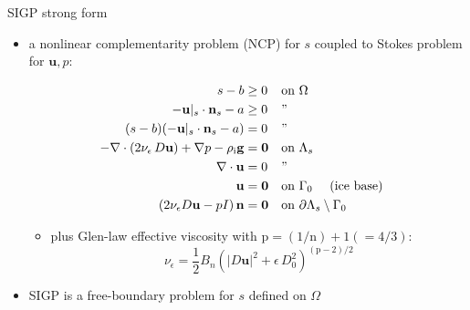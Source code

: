 \documentclass{beamer}
\newcommand{\tikzmark}[1]{\tikz[overlay,remember picture] \node (#1) {};}
\newcommand{\eps}{\epsilon}
\newcommand{\bn}{\mathbf{n}}
\newcommand{\bu}{\mathbf{u}}
\newcommand{\bzero}{\bm{0}}
\newcommand{\rhoi}{\rho_{\text{i}}}
\newcommand{\pp}{{\text{p}}}
\begin{document}
\begin{frame}{SIGP strong form}

\begin{itemize}
\item \alert{a nonlinear complementarity problem (NCP) for $s$ coupled to Stokes problem for $\bu,p$:}

\vspace{-5mm}

\begin{align*}
s - b &\ge 0 && \text{on $\Omega$} & \tikzmark{ncptop} \\
- \bu|_s \cdot \bn_s - a &\ge 0 && \text{''} \\
(s - b) (- \bu|_s \cdot \bn_s - a) &= 0 && \text{''} & \tikzmark{ncpbot} \\
- \nabla \cdot \left(2 \nu_\eps\, D\bu\right) + \nabla p - \rhoi \mathbf{g} &= \bzero && \text{on $\Lambda_s$} & \tikzmark{gstop} \\
\nabla \cdot \bu &= 0 && \text{''} \\
\bu &= \bzero && \text{on $\Gamma_0$ \quad (ice base)} \\
\left(2 \nu_\eps D\bu - pI\right) \bn &= \bzero && \text{on $\partial \Lambda_s \setminus \Gamma_0$} & \tikzmark{gsbot}
\end{align*}



\vspace{-8mm}

    \begin{itemize}
    \item plus Glen-law effective viscosity with $\text{p}=(1/\text{n})+1(=4/3)$:
      $$\nu_\eps = \frac{1}{2} B_n \left(|D\bu|^2 + \eps\, D_0^2\right)^{(\pp-2)/2}$$
    \end{itemize}
\item SIGP is a free-boundary problem for $s$ defined on $\Omega$
\end{itemize}
\end{frame}
\end{document}
